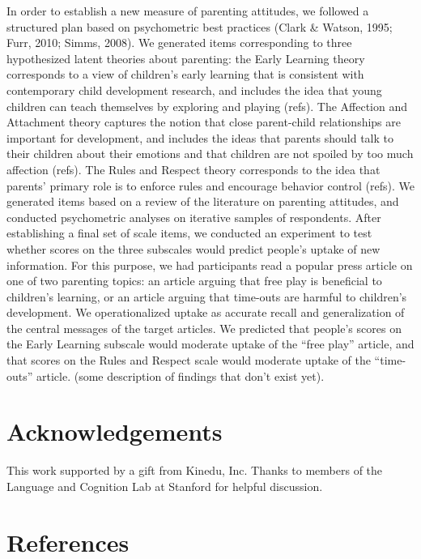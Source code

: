 \documentclass[10pt, letterpaper]{article}
\begin{document}
In order to establish a new measure of parenting attitudes, we followed
a structured plan based on psychometric best practices (Clark \& Watson,
1995; Furr, 2010; Simms, 2008). We generated items corresponding to
three hypothesized latent theories about parenting: the Early Learning
theory corresponds to a view of children's early learning that is
consistent with contemporary child development research, and includes
the idea that young children can teach themselves by exploring and
playing (refs). The Affection and Attachment theory captures the notion
that close parent-child relationships are important for development, and
includes the ideas that parents should talk to their children about
their emotions and that children are not spoiled by too much affection
(refs). The Rules and Respect theory corresponds to the idea that
parents' primary role is to enforce rules and encourage behavior control
(refs). We generated items based on a review of the literature on
parenting attitudes, and conducted psychometric analyses on iterative
samples of respondents. After establishing a final set of scale items,
we conducted an experiment to test whether scores on the three subscales
would predict people's uptake of new information. For this purpose, we
had participants read a popular press article on one of two parenting
topics: an article arguing that free play is beneficial to children's
learning, or an article arguing that time-outs are harmful to children's
development. We operationalized uptake as accurate recall and
generalization of the central messages of the target articles. We
predicted that people's scores on the Early Learning subscale would
moderate uptake of the ``free play'' article, and that scores on the
Rules and Respect scale would moderate uptake of the ``time-outs''
article. (some description of findings that don't exist yet).

\section{Acknowledgements}\label{acknowledgements}

This work supported by a gift from Kinedu, Inc. Thanks to members of the
Language and Cognition Lab at Stanford for helpful discussion.

\section{References}\label{references}

\small
\end{document}

